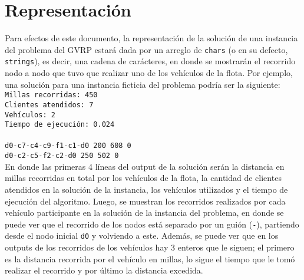 \documentclass[letter, 10pt]{article}
\begin{document}
\newpage

\section{Representación}
Para efectos de este documento, la representación de la solución de una instancia del problema del GVRP estará dada por un arreglo de \texttt{chars} (o en su defecto, \texttt{strings}), es decir, una cadena de carácteres, en donde se mostrarán el recorrido nodo a nodo que tuvo que realizar uno de los vehículos de la flota. Por ejemplo, una solución para una instancia ficticia del problema podría ser la siguiente:\\

\noindent\texttt{Millas recorridas: 450}\\
\texttt{Clientes atendidos: 7}\\
\texttt{Vehículos: 2}\\
\texttt{Tiempo de ejecución: 0.024}\\
\\
\texttt{d0-c7-c4-c9-f1-c1-d0 200   608   0}\\
\texttt{d0-c2-c5-f2-c2-d0 250   502   0}\\

En donde las primeras 4 líneas del output de la solución serán la distancia en millas recorridas en total por los vehículos de la flota, la cantidad de clientes atendidos en la solución de la instancia, los vehículos utilizados y el tiempo de ejecución del algoritmo. Luego, se muestran los recorridos realizados por cada vehículo participante en la solución de la instancia del problema, en donde se puede ver que el recorrido de los nodos está separado por un guión (\texttt{-}), partiendo desde el nodo inicial \texttt{d0} y volviendo a este. Además, se puede ver que en los outputs de los recorridos de los vehículos hay 3 enteros que le siguen; el primero es la distancia recorrida por el vehículo en millas, lo sigue el tiempo que le tomó realizar el recorrido y por último la distancia excedida.

\newpage
\end{document}
